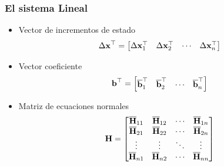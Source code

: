 \begin{frame}
    \frametitle{El sistema Lineal}
    
    \begin{itemize}
        \item Vector de incrementos de estado
        \begin{equation*}
            \Delta\boldsymbol{\mathbf{x}}^{\top} =
            \begin{bmatrix}
            \Delta\boldsymbol{\mathbf{x}}_{1}^{\top}    & \Delta\boldsymbol{\mathbf{x}}_{2}^{\top} & \cdots & \Delta\boldsymbol{\mathbf{x}}_{n}^{\top}
            \end{bmatrix}
        \end{equation*}
    \item Vector coeficiente
        \begin{equation*}
            \boldsymbol{\mathbf{b}}^{\top} =
            \begin{bmatrix}
                \overline{\boldsymbol{\mathbf{b}}}_{1}^{\top} & \overline{\boldsymbol{\mathbf{b}}}_{2}^{\top} & \cdots & \overline{\boldsymbol{\mathbf{b}}}_{n}^{\top}
            \end{bmatrix}
        \end{equation*}
    \item Matriz de ecuaciones normales
        \begin{equation*}
            \boldsymbol{\mathbf{H}} =
            \begin{bmatrix}
            \overline{\boldsymbol{\mathbf{H}}}_{11} & \overline{\boldsymbol{\mathbf{H}}}_{12} & \cdots & \overline{\boldsymbol{\mathbf{H}}}_{1n}\\
            \overline{\boldsymbol{\mathbf{H}}}_{21} & \overline{\boldsymbol{\mathbf{H}}}_{22} & \cdots & \overline{\boldsymbol{\mathbf{H}}}_{2n}\\
            \vdots & \vdots & \ddots & \vdots\\
            \overline{\boldsymbol{\mathbf{H}}}_{n1} & \overline{\boldsymbol{\mathbf{H}}}_{n2} & \cdots & \overline{\boldsymbol{\mathbf{H}}}_{nn}\\
            \end{bmatrix}
        \end{equation*}
    \end{itemize}

\end{frame}

